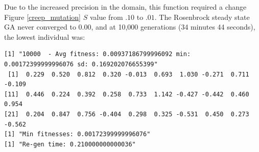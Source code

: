 \documentclass[12pt]{article}
\begin{document}
Due to the increased precision in the domain, this function required a change Figure \ref{creep_mutation} $S$ value from $.10 $ to $.01$.  The Rosenbrock steady state GA never converged to 0.00, and at 10,000 generations (34 minutes 44 seconds), the lowest individual was:
\scriptsize
\begin{lstlisting}
[1] "10000  - Avg fitness: 0.00937186799996092 min: 0.00172399999996076 sd: 0.169202076655399"
 [1]  0.229  0.520  0.812  0.320 -0.013  0.693  1.030 -0.271  0.711 -0.109
[11]  0.446  0.224  0.392  0.258  0.733  1.142 -0.427 -0.442  0.460  0.954
[21]  0.204  0.847  0.756 -0.404  0.298  0.325 -0.531  0.450  0.273 -0.562
[1] "Min fitnesses: 0.00172399999996076"
[1] "Re-gen time: 0.210000000000036"
\end{lstlisting}
\normalsize

\pagebreak
\end{document}
